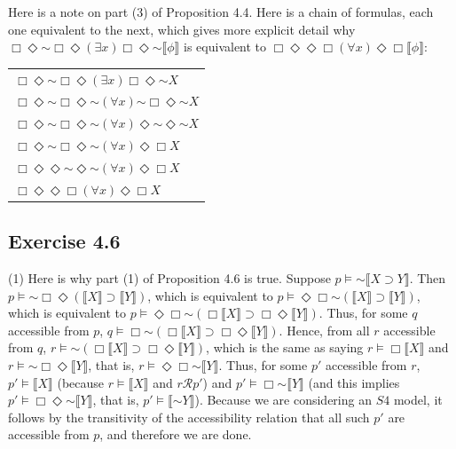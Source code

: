 \documentclass{article}
\newcommand*{\oldneg}{\mathord{\sim}}
\newcommand{\lbc}{\llbracket}
\newcommand{\rbc}{\rrbracket}
\theoremstyle{definition}
\begin{document}
Here is a note on part (3) of Proposition 4.4. Here is a chain of formulas, each one equivalent to the next, which gives more explicit 
detail why $\Box\Diamond\oldneg\Box\Diamond(\exists x)\Box\Diamond\oldneg\llbracket\phi\rrbracket$ is equivalent to 
$\Box\Diamond\Diamond\Box(\forall x)\Diamond\Box\llbracket\phi\rrbracket$:
\begin{center}
\begin{tabular}{l}
$\Box\Diamond\oldneg\Box\Diamond(\exists x)\Box\Diamond\oldneg X$ \\
$\Box\Diamond\oldneg\Box\Diamond\oldneg(\forall x)\oldneg\Box\Diamond\oldneg X$ \\
$\Box\Diamond\oldneg\Box\Diamond\oldneg(\forall x)\Diamond\oldneg\Diamond\oldneg X$ \\
$\Box\Diamond\oldneg\Box\Diamond\oldneg(\forall x)\Diamond\Box X$ \\
$\Box\Diamond\Diamond\oldneg\Diamond\oldneg(\forall x)\Diamond\Box X$ \\
$\Box\Diamond\Diamond\Box(\forall x)\Diamond\Box X$
\end{tabular}
\end{center}

\subsection*{Exercise 4.6}
(1) Here is why part (1) of Proposition 4.6 is true. Suppose $p\vDash\oldneg\llbracket X\supset Y\rrbracket$. Then
$p\vDash\oldneg\Box\Diamond(\llbracket X\rrbracket\supset\llbracket Y\rrbracket)$, which is equivalent to
$p\vDash\Diamond\Box\oldneg(\llbracket X\rrbracket\supset\llbracket Y\rrbracket)$, which is equivalent to
$p\vDash\Diamond\Box\oldneg(\Box\llbracket X\rrbracket\supset\Box\Diamond\llbracket Y\rrbracket)$. Thus, for 
some $q$ accessible from $p$,
$q\vDash\Box\oldneg(\Box\llbracket X\rrbracket\supset\Box\Diamond\llbracket Y\rrbracket)$. Hence, from all 
$r$ accessible from $q$,
$r\vDash\oldneg(\Box\llbracket X\rrbracket\supset\Box\Diamond\llbracket Y\rrbracket)$, which is the same as saying
$r\vDash\Box\llbracket X\rrbracket$ and $r\vDash\oldneg\Box\Diamond\llbracket Y\rrbracket$, that is, 
$r\vDash\Diamond\Box\oldneg\llbracket Y\rrbracket$. Thus, for some $p'$ accessible from $r$, 
$p'\vDash\llbracket X\rrbracket$ (because $r\vDash\lbc X\rbc$ and $r\mathcal{R}p'$)
and $p'\vDash\Box\oldneg\llbracket Y\rrbracket$ (and this implies 
$p'\vDash\Box\Diamond\oldneg\llbracket Y\rrbracket$, that is, $p'\vDash\llbracket\oldneg Y\rrbracket$). Because 
we are considering an $S4$ model, it follows by the transitivity of the accessibility relation that all such 
$p'$ are accessible from $p$, and therefore we are done.
\end{document}
